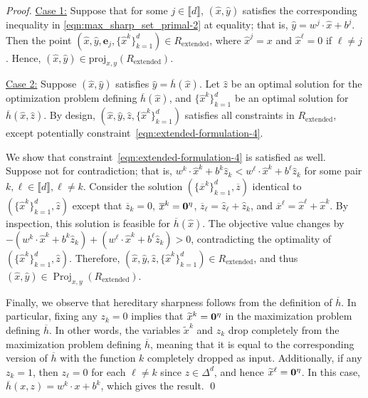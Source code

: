 \documentclass[smallextended]{svjour3}
\newcommand{\Proj}{\operatorname{Proj}}
\newcommand{\tx}{\widetilde{x}}
\newcommand{\Rextended}{R_{\operatorname{extended}}}
\renewcommand{\bar}[1]{\overline{#1}}
\begin{document}
\begin{proof}
\underline{Case 1:} Suppose that for some $j \in \llbracket d \rrbracket$, $(\hat{x}, \hat{y})$ satisfies the corresponding inequality in \eqref{eqn:max_sharp_set_primal-2} at equality; that is, $\hat{y} = w^j \cdot \hat{x} + b^j$. Then the point $(\hat{x}, \hat{y}, \mathbf{e}_j, \{\hat{x}^k\}_{k=1}^d) \in \Rextended$, where $\hat{x}^j = x$ and $\hat{x}^\ell = 0$ if $\ell \neq j$. Hence, $(\hat{x}, \hat{y}) \in \text{proj}_{x,y}(\Rextended)$.

\underline{Case 2:} Suppose $(\hat{x}, \hat{y})$ satisfies $\hat{y} = \bar{h}(\hat{x})$. Let $\hat{z}$ be an optimal solution for the optimization problem defining $\bar{h}(\hat{x})$, and $\{\hat{x}^k\}_{k=1}^d$ be an optimal solution for $\bar{h}(\hat{x},\hat{z})$. By design, $(\hat{x}, \hat{y}, \hat{z}, \{\hat{x}^k\}_{k=1}^d)$ satisfies all constraints in $\Rextended$, except potentially constraint~\eqref{eqn:extended-formulation-4}.

We show that constraint~\eqref{eqn:extended-formulation-4} is satisfied as well. Suppose not for contradiction; that is, $w^k \cdot \hat{x}^k + b^k \hat{z}_k < w^\ell \cdot \hat{x}^k + b^\ell \hat{z}_k$ for some pair $k, \ell \in \llbracket d \rrbracket, \ell \neq k$. Consider the solution $(\{\bar{x}^k\}_{k=1}^d, \bar{z})$ identical to $(\{\hat{x}^k\}_{k=1}^d, \hat{z})$ except that $\bar{z}_k = 0$, $\bar{x}^k = {\bf 0}^\eta$, $\bar{z}_\ell = \hat{z}_\ell + \hat{z}_k$, and $\bar{x}^\ell = \hat{x}^\ell + \hat{x}^k$. By inspection, this solution is feasible for $\bar{h}(\hat{x})$. The objective value changes by $- (w^k \cdot \hat{x}^k + b^k \hat{z}_k) + (w^\ell \cdot \hat{x}^k + b^\ell \hat{z}_k) > 0$, contradicting the optimality of $(\{\hat{x}^k\}_{k=1}^d, \hat{z})$. Therefore, $(\hat{x}, \hat{y}, \hat{z}, \{\hat{x}^k\}_{k=1}^d) \in \Rextended$, and thus $(\hat{x}, \hat{y}) \in \Proj_{x,y}(\Rextended)$.

Finally, we observe that hereditary sharpness follows from the definition of $\bar{h}$. In particular, fixing any $z_k = 0$ implies that $\tx^k = {\bf 0}^\eta$ in the maximization problem defining $\bar{h}$. In other words, the variables $\tx^k$ and $z_k$ drop completely from the maximization problem defining $\bar{h}$, meaning that it is equal to the corresponding version of $\bar{h}$ with the function $k$ completely dropped as input. Additionally, if any $z_k = 1$, then $z_\ell = 0$ for each $\ell \neq k$ since $z \in \Delta^d$, and hence $\tx^\ell = {\bf 0}^\eta$. In this case, $\bar{h}(x,z) = w^k \cdot x + b^k$, which gives the result.
\qed\end{proof}
\end{document}
